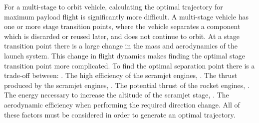 For a multi-stage to orbit vehicle, calculating the optimal trajectory for maximum payload flight is significantly more difficult. A multi-stage vehicle has one or more stage transition points, where the vehicle separates a component which is discarded or reused later, and does not continue to orbit. At a stage transition point there is a large change in the mass and aerodynamics of the launch system. 
This change in flight dynamics makes finding the optimal stage transition point more complicated. To find the optimal separation point there is a trade-off between:
 . The high efficiency of the scramjet engines,
 . The thrust produced by the scramjet engines, 
 . The potential thrust of the rocket engines,
 . The energy necessary to increase the altitude of the scramjet stage,
 . The aerodynamic efficiency when performing the required direction change.
All of these factors must be considered in order to generate an optimal trajectory. 


